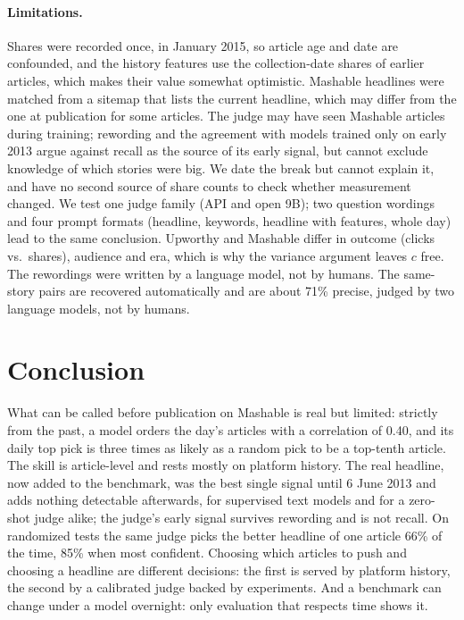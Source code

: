 \documentclass[10pt,a4paper,twocolumn]{article}
\begin{document}
\paragraph{Limitations.} Shares were recorded once, in January 2015, so article age and date are confounded, and
the history features use the collection-date shares of earlier articles, which makes their value somewhat
optimistic. Mashable headlines were matched from a sitemap that lists the current headline, which may differ from
the one at publication for some articles. The judge may have seen Mashable articles during training; rewording and
the agreement with models trained only on early 2013 argue against recall as the source of its early signal, but
cannot exclude knowledge of which stories were big. We date the break but cannot explain it, and have no second
source of share counts to check whether measurement changed. We test one judge family (API and open 9B); two question wordings and four prompt formats (headline,
keywords, headline with features, whole day) lead to the same conclusion. Upworthy and Mashable differ in outcome (clicks vs.\ shares), audience and era, which
is why the variance argument leaves $c$ free. The rewordings were written by a language model, not by humans. The same-story pairs are recovered automatically and are about 71\%
precise, judged by two language models, not by humans.

\section{Conclusion}
What can be called before publication on Mashable is real but limited: strictly from the past, a model orders
the day's articles with a correlation of 0.40, and its daily top pick is three times as likely as a random pick to be a
top-tenth article. The skill is article-level and rests mostly on platform history. The real headline, now added to
the benchmark, was the best single signal until 6 June 2013 and adds nothing detectable afterwards, for supervised
text models and for a zero-shot judge alike; the judge's early signal survives rewording and is not recall. On
randomized tests the same judge picks the better headline of one article 66\% of the time, 85\% when most confident.
Choosing which articles to push and choosing a headline are different decisions: the first is served by platform
history, the second by a calibrated judge backed by experiments. And a benchmark can change under a model
overnight: only evaluation that respects time shows it.

\setlength{\bibsep}{0pt}\renewcommand{\bibfont}{\scriptsize}


\end{document}
